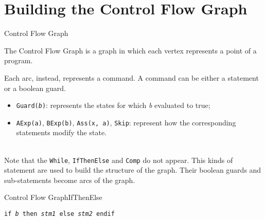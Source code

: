 \documentclass{beamer}
\begin{document}
\section{Building the Control Flow Graph}

\begin{frame}{Control Flow Graph}

    The Control Flow Graph is a graph in which each vertex represents a point of a program.

    Each arc, instead, represents a command.
    A command can be either a statement or a boolean guard.

    \begin{itemize}
        \item \texttt{Guard(\textit{b})}: represents the states for which \textit{b} evaluated to true;
        \item \texttt{AExp(a)}, \texttt{BExp(b)}, \texttt{Ass(x, a)}, \texttt{Skip}: represent how the corresponding statements modify the state.
    \end{itemize}

    ~\\
    Note that the \texttt{While}, \texttt{IfThenElse} and \texttt{Comp} do not appear.
    This kinds of statement are used to build the structure of the graph.
    Their boolean guards and sub-statements become arcs of the graph.

\end{frame}

\begin{frame}{Control Flow Graph}{IfThenElse}

    \texttt{if \textit{b} then \textit{stm1} else \textit{stm2} endif}

    ~\\~\\\centering

\end{frame}
\end{document}
